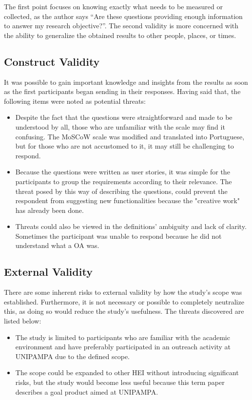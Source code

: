 The first point focuses on knowing exactly what needs to be measured or collected, as the author says ``Are these questions providing enough information to answer my research objective?''. The second validity is more concerned with the ability to generalize the obtained results to other people, places, or times.

\subsection{Construct Validity}\label{sec:survey-construct-validity}

It was possible to gain important knowledge and insights from the results as soon as the first participants began sending in their responses. Having said that, the following items were noted as potential threats:

\begin{itemize}
  \item Despite the fact that the questions were straightforward and made to be understood by all, those who are unfamiliar with the scale may find it confusing. The MoSCoW scale was modified and translated into Portuguese, but for those who are not accustomed to it, it may still be challenging to respond.
  \item Because the questions were written as user stories, it was simple for the participants to group the requirements according to their relevance. The threat posed by this way of describing the questions, could prevent the respondent from suggesting new functionalities because the "creative work" has already been done.
  \item Threats could also be viewed in the definitions' ambiguity and lack of clarity. Sometimes the participant was unable to respond because he did not understand what a \ac{OA} was.
\end{itemize}

\subsection{External Validity}\label{sec:survey-external-validity}

There are some inherent risks to external validity by how the study's scope was established.
Furthermore, it is not necessary or possible to completely neutralize this, as doing so would reduce the study's usefulness. The threats discovered are listed below:

\begin{itemize}
  \item The study is limited to participants who are familiar with the academic environment and have preferably participated in an outreach activity at \ac{UNIPAMPA} due to the defined scope.
  \item The scope could be expanded to other \ac{HEI} without introducing significant risks, but the study would become less useful because this term paper describes a goal product aimed at \ac{UNIPAMPA}.
\end{itemize}

